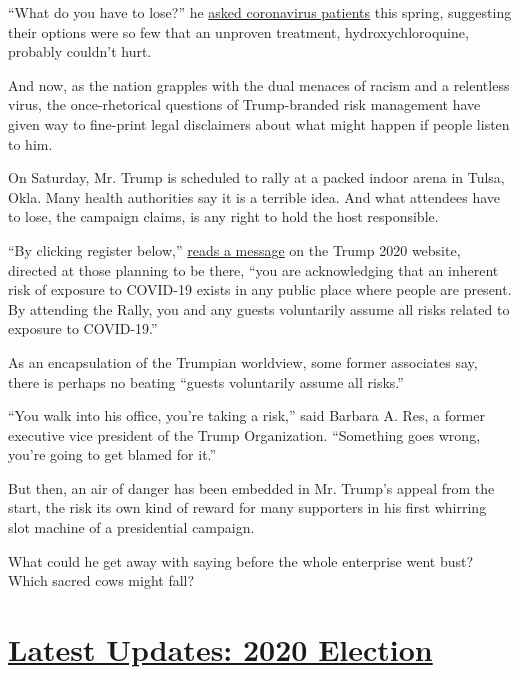 ``What do you have to lose?'' he
\href{https://www.nytimes.com/2020/05/18/us/politics/trump-hydroxychloroquine-covid-coronavirus.html}{asked
coronavirus patients} this spring, suggesting their options were so few
that an unproven treatment, hydroxychloroquine, probably couldn't hurt.

And now, as the nation grapples with the dual menaces of racism and a
relentless virus, the once-rhetorical questions of Trump-branded risk
management have given way to fine-print legal disclaimers about what
might happen if people listen to him.

On Saturday, Mr. Trump is scheduled to rally at a packed indoor arena in
Tulsa, Okla. Many health authorities say it is a terrible idea. And what
attendees have to lose, the campaign claims, is any right to hold the
host responsible.

``By clicking register below,''
\href{https://www.nytimes.com/2020/06/11/us/politics/trump-rally-coronavirus.html}{reads
a message} on the Trump 2020 website, directed at those planning to be
there, ``you are acknowledging that an inherent risk of exposure to
COVID-19 exists in any public place where people are present. By
attending the Rally, you and any guests voluntarily assume all risks
related to exposure to COVID-19.''

As an encapsulation of the Trumpian worldview, some former associates
say, there is perhaps no beating ``guests voluntarily assume all
risks.''

``You walk into his office, you're taking a risk,'' said Barbara A. Res,
a former executive vice president of the Trump Organization. ``Something
goes wrong, you're going to get blamed for it.''

But then, an air of danger has been embedded in Mr. Trump's appeal from
the start, the risk its own kind of reward for many supporters in his
first whirring slot machine of a presidential campaign.

What could he get away with saying before the whole enterprise went
bust? Which sacred cows might fall?

\hypertarget{latest-updates-2020-election}{%
\section{\texorpdfstring{\href{https://www.nytimes.com/2020/07/31/us/elections/biden-vs-trump.html?action=click\&pgtype=Article\&state=default\&region=MAIN_CONTENT_1\&context=storylines_live_updates}{Latest
Updates: 2020
Election}}{Latest Updates: 2020 Election}}\label{latest-updates-2020-election}}

